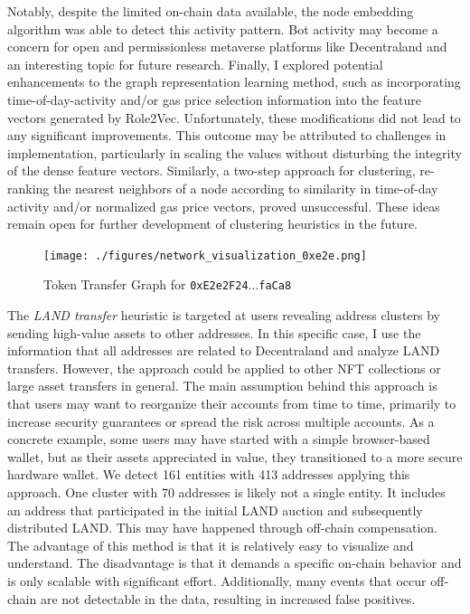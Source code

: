 \documentclass[12pt,a4paper,titlepage,oneside,english]{article}
\begin{document}
Notably, despite the limited on-chain data available, the node embedding algorithm was able to detect this activity pattern. Bot activity may become a concern for open and permissionless metaverse platforms like Decentraland and an interesting topic for future research. \newline
Finally, I explored potential enhancements to the graph representation learning method, such as incorporating time-of-day-activity and/or gas price selection information into the feature vectors generated by Role2Vec. Unfortunately, these modifications did not lead to any significant improvements. This outcome may be attributed to challenges in implementation, particularly in scaling the values without disturbing the integrity of the dense feature vectors.  
Similarly, a two-step approach for clustering, re-ranking the nearest neighbors of a node according to similarity in time-of-day activity and/or normalized gas price vectors, proved unsuccessful. These ideas remain open for further development of clustering heuristics in the future.

\begin{figure}[h!]
	\centering
	\texttt{[image: ./figures/network\_visualization\_0xe2e.png]}
	\caption{Token Transfer Graph for \texttt{0xE2e2F24$\dots$faCa8}}
	\label{fig:cluster}
\end{figure}

The \textit{LAND transfer} heuristic is targeted at users revealing address clusters by sending high-value assets to other addresses. In this specific case, I use the information that all addresses are related to Decentraland and analyze LAND transfers. However, the approach could be applied to other NFT collections or large asset transfers in general. \newline
The main assumption behind this approach is that users may want to reorganize their accounts from time to time, primarily to increase security guarantees or spread the risk across multiple accounts. As a concrete example, some users may have started with a simple browser-based wallet, but as their assets appreciated in value, they transitioned to a more secure hardware wallet. We detect 161 entities with 413 addresses applying this approach. One cluster with 70 addresses is likely not a single entity. It includes an address that participated in the initial LAND auction and subsequently distributed LAND. This may have happened through off-chain compensation. The advantage of this method is that it is relatively easy to visualize and understand. The disadvantage is that it demands a specific on-chain behavior and is only scalable with significant effort. Additionally, many events that occur off-chain are not detectable in the data, resulting in increased false positives. 
\end{document}

